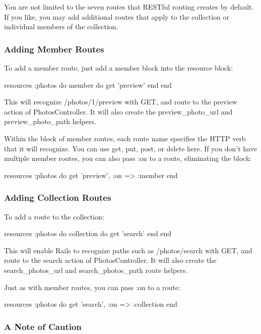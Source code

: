 \documentclass[10pt]{book}
\newenvironment{code}{%
  \scriptsize
    \verbatim
}{%
    \endverbatim
    \newline
}
\begin{document}
You are not limited to the seven routes that RESTful routing creates  by default. If you like, you may add additional routes that apply to the  collection or individual members of the collection.

\subsubsection{ Adding Member Routes}

To add a member route, just add a member block into the resource block:
\begin{code}
resources :photos do
  member do
    get 'preview'
  end
end
\end{code}

This will recognize /photos/1/preview with GET, and route to the preview action of PhotosController. It will also create the preview\_photo\_url and preview\_photo\_path helpers.

Within the block of member routes, each route name specifies the HTTP verb that it will recognize. You can use get, put, post, or delete here. If you don’t have multiple member routes, you can also pass :on to a route, eliminating the block:
\begin{code}
resources :photos do
  get 'preview', :on => :member
end
\end{code}

\subsubsection{ Adding Collection Routes}

To add a route to the collection:
\begin{code}
resources :photos do
  collection do
    get 'search'
  end
end
\end{code}

This will enable Rails to recognize paths such as /photos/search with GET, and route to the search action of PhotosController. It will also create the search\_photos\_url and search\_photos\_path route helpers.

Just as with member routes, you can pass :on to a route:
\begin{code}
resources :photos do
  get 'search', :on => :collection
end
\end{code}

\subsubsection{ A Note of Caution}
\end{document}
